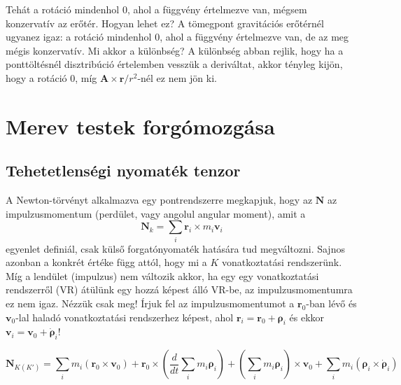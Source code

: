 \documentclass[12pt,a4paper]{scrartcl}
\let\mathbf\bm
\begin{document}
Tehát a rotáció mindenhol 0, ahol a függvény értelmezve van, mégsem konzervatív az erőtér. Hogyan lehet ez? A  tömegpont gravitációs erőtérnél ugyanez igaz: a rotáció mindenhol 0, ahol a függvény értelmezve van, de az meg mégis konzervatív. Mi akkor a különbség? A különbség abban rejlik, hogy ha a ponttöltésnél disztribúció értelemben vesszük a deriváltat, akkor tényleg kijön, hogy a rotáció 0, míg ${\mathbf{A}} \times {\mathbf{r}}/{r^2}$-nél ez nem jön ki.

\section{Merev testek forgómozgása}
\subsection{Tehetetlenségi nyomaték tenzor}
A Newton-törvényt alkalmazva egy pontrendszerre megkapjuk, hogy az ${\mathbf{N}}$ az impulzusmomentum (perdület, vagy angolul angular moment), amit a 
\begin{equation}
{\mathbf{N}_k} = \sum\limits_i {{{\mathbf{r}}_i} \times {m_i}{{\mathbf{v}}_i}} 
\end{equation}
egyenlet definiál, csak külső forgatónyomaték hatására tud megváltozni. Sajnos azonban a konkrét értéke függ attól, hogy mi a $K$ vonatkoztatási rendszerünk. Míg a lendület (impulzus) nem változik akkor, ha egy egy vonatkoztatási rendszerről (VR) átülünk egy hozzá képest álló VR-be, az impulzusmomentumra ez nem igaz. Nézzük csak meg! Írjuk fel az impulzusmomentumot a ${{\mathbf{r}}_0}$-ban lévő és ${{\mathbf{v}}_0}$-lal haladó vonatkoztatási rendszerhez képest, ahol ${{\mathbf{r}}_i} = {{\mathbf{r}}_0} + {{\mathbf{\rho }}_i}$ és ekkor ${{\mathbf{v}}_i} = {{\mathbf{v}}_0} + {{\mathbf{\dot \rho }}_i}$!

\[{{\mathbf{N}}_{K\left( {K'} \right)}} = \sum\limits_i {{m_i}\left( {{{\mathbf{r}}_0} \times {{\mathbf{v}}_0}} \right)}  + {{\mathbf{r}}_0} \times \left( {\frac{d}{{dt}}\sum\limits_i {{m_i}{{\mathbf{\rho }}_i}} } \right) + \left( {\sum\limits_i {{m_i}{{\mathbf{\rho }}_i}} } \right) \times {{\mathbf{v}}_0} + \sum\limits_i {{m_i}\left( {{{\mathbf{\rho }}_i} \times {{{\mathbf{\dot \rho }}}_i}} \right)} \]
\end{document}
